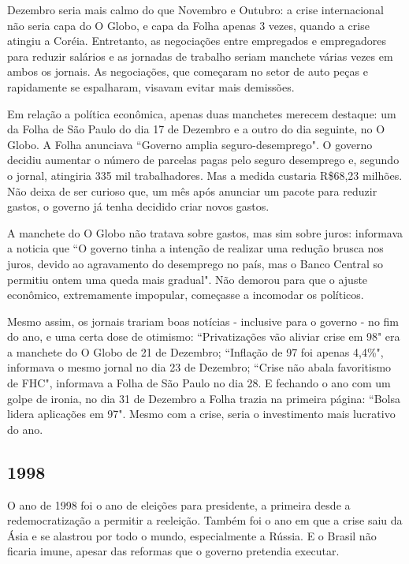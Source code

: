 \documentclass{article}
\begin{document}
Dezembro seria mais calmo do que Novembro e Outubro: a crise internacional não seria capa do O Globo, e capa da Folha apenas 3 vezes, quando a crise atingiu a Coréia. Entretanto, as negociações entre empregados e empregadores para reduzir salários e as jornadas de trabalho seriam manchete várias vezes em ambos os jornais. As negociações, que começaram no setor de auto peças e rapidamente se espalharam, visavam evitar mais demissões.

Em relação a política econômica, apenas duas manchetes merecem destaque: um da Folha de São Paulo do dia 17 de Dezembro e a outro do dia seguinte, no O Globo. A Folha anunciava  ``Governo amplia seguro-desemprego". O governo decidiu aumentar o número de parcelas pagas pelo seguro desemprego e, segundo o jornal, atingiria 335 mil trabalhadores. Mas a medida custaria R\$68,23 milhões. Não deixa de ser curioso que, um mês após anunciar um pacote para reduzir gastos, o governo já tenha decidido criar novos gastos.

A manchete do O Globo não tratava sobre gastos, mas sim sobre juros: informava a noticia que ``O governo tinha a intenção de realizar uma redução brusca nos juros, devido ao agravamento do desemprego no país, mas o Banco Central so permitiu ontem uma queda mais gradual". Não demorou para que o ajuste econômico, extremamente impopular, começasse a incomodar os políticos.

Mesmo assim, os jornais trariam boas notícias - inclusive para o governo - no fim do ano, e uma certa dose de otimismo: ``Privatizações vão aliviar crise em 98" era a manchete do O Globo de 21 de Dezembro; ``Inflação de 97 foi apenas 4,4\%", informava o mesmo jornal no dia 23 de Dezembro; ``Crise não abala favoritismo de FHC", informava a Folha de São Paulo no dia 28. E fechando o ano com um golpe de ironia, no dia 31 de Dezembro a Folha trazia na primeira página: ``Bolsa lidera aplicações em 97". Mesmo com a crise, seria o investimento mais lucrativo do ano.               

\subsection*{1998}

O ano de 1998 foi o ano de eleições para presidente, a primeira desde a redemocratização a permitir a reeleição. Também foi o ano em que a crise saiu da Ásia e se alastrou por todo o mundo, especialmente a Rússia. E o Brasil não ficaria imune, apesar das reformas que o governo pretendia executar. 
\end{document}
